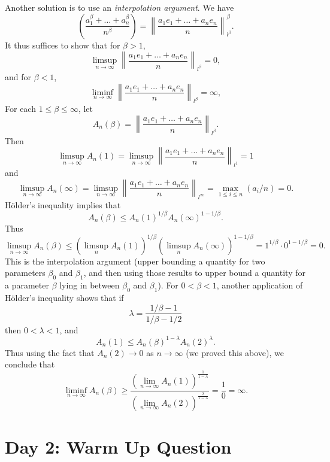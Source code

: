 \documentclass[answers]{exam}
\begin{document}
\begin{questions}
\begin{parts}
\begin{solution}
		Another solution is to use an \emph{interpolation argument}. We have
		\[ \left( \frac{a_1^\beta + \dots + a_n^\beta}{n^\beta} \right) = \left\| \frac{a_1e_1 + \dots + a_ne_n}{n} \right\|_{l^\beta}^\beta. \]
		It thus suffices to show that for $\beta > 1$,
		\[ \limsup_{n \to \infty} \left\| \frac{a_1e_1 + \dots + a_ne_n}{n} \right\|_{l^\beta} = 0, \]
		and for $\beta < 1$,
		\[ \liminf_{n \to \infty} \left\| \frac{a_1e_1 + \dots + a_ne_n}{n} \right\|_{l^\beta} = \infty, \]
		For each $1 \leq \beta \leq \infty$, let
		\[ A_n(\beta) = \left\| \frac{a_1e_1 + \dots + a_ne_n}{n} \right\|_{l^\beta}. \]
		Then
		\[ \limsup_{n \to \infty} A_n(1) = \limsup_{n \to \infty} \left\| \frac{a_1e_1 + \dots + a_ne_n}{n} \right\|_{l^1} = 1 \]
		and
		\[ \limsup_{n \to \infty} A_n(\infty) = \limsup_{n \to \infty} \left\| \frac{a_1e_1 + \dots + a_ne_n}{n} \right\|_{l^\infty} = \max_{1 \leq i \leq n}(a_i/n) = 0. \]
		H\"{o}lder's inequality implies that
		\[ A_n(\beta) \leq A_n(1)^{1/\beta} A_n(\infty)^{1-1/\beta}. \]
		Thus
		\[ \limsup_{n \to \infty} A_n(\beta) \leq (\limsup_n A_n(1))^{1/\beta} (\limsup_n A_n(\infty))^{1 - 1/\beta} = 1^{1/\beta} \cdot 0^{1 - 1/\beta} = 0. \]
		This is the interpolation argument (upper bounding a quantity for two parameters $\beta_0$ and $\beta_1$, and then using those results to upper bound a quantity for a parameter $\beta$ lying in between $\beta_0$ and $\beta_1$). For $0 < \beta < 1$, another application of H\"{o}lder's inequality shows that if
		\[ \lambda = \frac{1/\beta - 1}{1/\beta - 1/2} \]
		then $0 < \lambda < 1$, and
		\[ A_n(1) \leq A_n(\beta)^{1-\lambda} A_n(2)^\lambda. \]
		Thus using the fact that $A_n(2) \to 0$ as $n \to \infty$ (we proved this above), we conclude that
		\[ \liminf_{n \to \infty} A_n(\beta) \geq \frac{\left( \lim_{n \to \infty} A_n(1) \right)^{\frac{1}{1 - \lambda}}}{\left( \lim_{n \to \infty} A_n(2) \right)^{\frac{\lambda}{1 - \lambda}}} = \frac{1}{0} = \infty. \]
	\end{solution}
\end{parts}
   
\newpage
\section{Day 2: Warm Up Question}


\end{questions}
\end{document}

